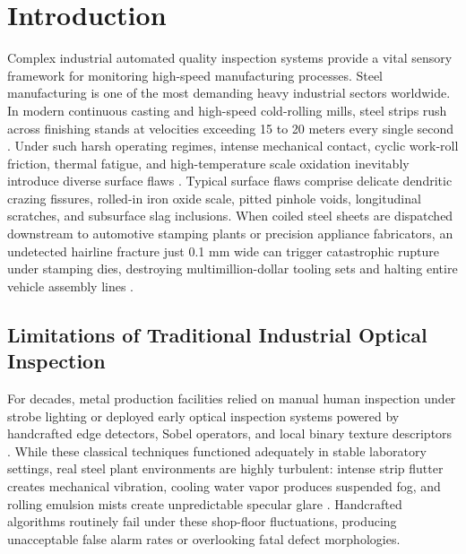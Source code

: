 \documentclass{ieeeaccess}
\begin{document}
\titlepgskip=-15pt

\maketitle

\section{Introduction}
\label{sec:introduction}
Complex industrial automated quality inspection systems provide a vital sensory framework for monitoring high-speed manufacturing processes. Steel manufacturing is one of the most demanding heavy industrial sectors worldwide. In modern continuous casting and high-speed cold-rolling mills, steel strips rush across finishing stands at velocities exceeding 15 to 20 meters every single second \cite{survey2024}. Under such harsh operating regimes, intense mechanical contact, cyclic work-roll friction, thermal fatigue, and high-temperature scale oxidation inevitably introduce diverse surface flaws \cite{neu_benchmark2025}. Typical surface flaws comprise delicate dendritic crazing fissures, rolled-in iron oxide scale, pitted pinhole voids, longitudinal scratches, and subsurface slag inclusions. When coiled steel sheets are dispatched downstream to automotive stamping plants or precision appliance fabricators, an undetected hairline fracture just 0.1 mm wide can trigger catastrophic rupture under stamping dies, destroying multimillion-dollar tooling sets and halting entire vehicle assembly lines \cite{survey2024, csdd_dataset2025}.

\subsection{Limitations of Traditional Industrial Optical Inspection}
\label{sec:intro_limitations}
For decades, metal production facilities relied on manual human inspection under strobe lighting or deployed early optical inspection systems powered by handcrafted edge detectors, Sobel operators, and local binary texture descriptors \cite{survey2024}. While these classical techniques functioned adequately in stable laboratory settings, real steel plant environments are highly turbulent: intense strip flutter creates mechanical vibration, cooling water vapor produces suspended fog, and rolling emulsion mists create unpredictable specular glare \cite{ispad2025}. Handcrafted algorithms routinely fail under these shop-floor fluctuations, producing unacceptable false alarm rates or overlooking fatal defect morphologies.
\end{document}
